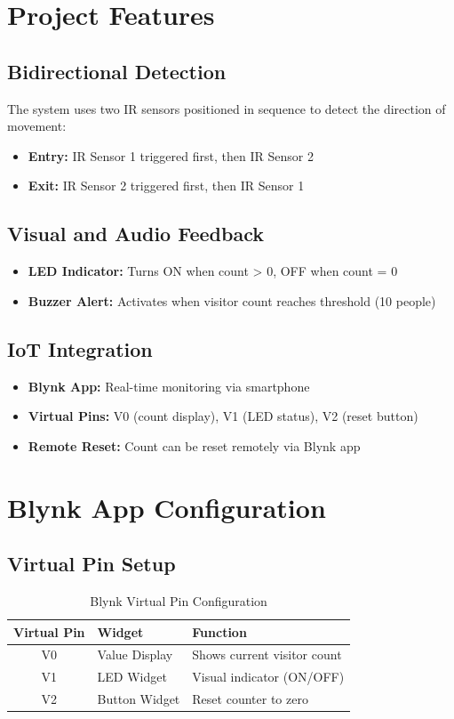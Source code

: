 \documentclass[12pt,a4paper]{article}
\begin{document}
\section{Project Features}

\subsection{Bidirectional Detection}
The system uses two IR sensors positioned in sequence to detect the direction of movement:
\begin{itemize}
  \item \textbf{Entry:} IR Sensor 1 triggered first, then IR Sensor 2
  \item \textbf{Exit:} IR Sensor 2 triggered first, then IR Sensor 1
\end{itemize}

\subsection{Visual and Audio Feedback}
\begin{itemize}
  \item \textbf{LED Indicator:} Turns ON when count > 0, OFF when count = 0
  \item \textbf{Buzzer Alert:} Activates when visitor count reaches threshold (10 people)
\end{itemize}

\subsection{IoT Integration}
\begin{itemize}
  \item \textbf{Blynk App:} Real-time monitoring via smartphone
  \item \textbf{Virtual Pins:} V0 (count display), V1 (LED status), V2 (reset button)
  \item \textbf{Remote Reset:} Count can be reset remotely via Blynk app
\end{itemize}

\section{Blynk App Configuration}

\subsection{Virtual Pin Setup}
\begin{table}[h!]
\centering
\begin{tabular}{|c|l|l|}
\hline
\textbf{Virtual Pin} & \textbf{Widget} & \textbf{Function} \\
\hline
V0 & Value Display & Shows current visitor count \\
V1 & LED Widget & Visual indicator (ON/OFF) \\
V2 & Button Widget & Reset counter to zero \\
\hline
\end{tabular}
\caption{Blynk Virtual Pin Configuration}
\end{table}
\end{document}
